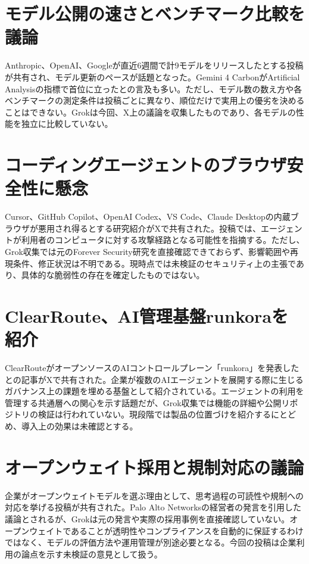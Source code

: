 \section{モデル公開の速さとベンチマーク比較を議論}
Anthropic、OpenAI、Googleが直近6週間で計9モデルをリリースしたとする投稿が共有され、モデル更新のペースが話題となった。Gemini 4 CarbonがArtificial Analysisの指標で首位に立ったとの言及も多い。ただし、モデル数の数え方や各ベンチマークの測定条件は投稿ごとに異なり、順位だけで実用上の優劣を決めることはできない。Grokは今回、X上の議論を収集したものであり、各モデルの性能を独立に比較していない。

\section{コーディングエージェントのブラウザ安全性に懸念}
Cursor、GitHub Copilot、OpenAI Codex、VS Code、Claude Desktopの内蔵ブラウザが悪用され得るとする研究紹介がXで共有された。投稿では、エージェントが利用者のコンピュータに対する攻撃経路となる可能性を指摘する。ただし、Grok収集では元のForever Security研究を直接確認できておらず、影響範囲や再現条件、修正状況は不明である。現時点では未検証のセキュリティ上の主張であり、具体的な脆弱性の存在を確定したものではない。

\section{ClearRoute、AI管理基盤runkoraを紹介}
ClearRouteがオープンソースのAIコントロールプレーン「runkora」を発表したとの記事がXで共有された。企業が複数のAIエージェントを展開する際に生じるガバナンス上の課題を埋める基盤として紹介されている。エージェントの利用を管理する共通層への関心を示す話題だが、Grok収集では機能の詳細や公開リポジトリの検証は行われていない。現段階では製品の位置づけを紹介するにとどめ、導入上の効果は未確認とする。

\section{オープンウェイト採用と規制対応の議論}
企業がオープンウェイトモデルを選ぶ理由として、思考過程の可読性や規制への対応を挙げる投稿が共有された。Palo Alto Networksの経営者の発言を引用した議論とされるが、Grokは元の発言や実際の採用事例を直接確認していない。オープンウェイトであることが透明性やコンプライアンスを自動的に保証するわけではなく、モデルの評価方法や運用管理が別途必要となる。今回の投稿は企業利用の論点を示す未検証の意見として扱う。
